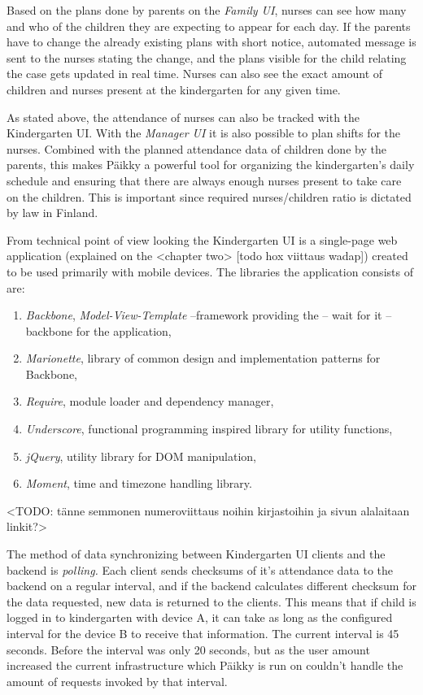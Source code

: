 Based on the plans done by parents on the \textit{Family UI}, nurses can see how many and who of the children they are expecting to appear for each day. If the parents have to change the already existing plans with short notice, automated message is sent to the nurses stating the change, and the plans visible for the child relating the case gets updated in real time. Nurses can also see the exact amount of children and nurses present at the kindergarten for any given time.

As stated above, the attendance of nurses can also be tracked with the Kindergarten UI. With the \textit{Manager UI} it is also possible to plan shifts for the nurses. Combined with the planned attendance data of children done by the parents, this makes Päikky a powerful tool for organizing the kindergarten's daily schedule and ensuring that there are always enough nurses present to take care on the children. This is important since required nurses/children ratio is dictated by law in Finland. %

From technical point of view looking the Kindergarten UI is a single-page web application (explained on the <chapter two> [todo hox viittaus wadap]) created to be used primarily with mobile devices. The libraries the application consists of are: %

\begin{enumerate}
	\item \textit{Backbone}, \textit{Model-View-Template} –framework providing the – wait for it – backbone for the application,
	\item \textit{Marionette}, library of common design and implementation patterns for Backbone,
	\item \textit{Require}, module loader and dependency manager,
	\item \textit{Underscore}, functional programming inspired library for utility functions,
	\item \textit{jQuery}, utility library for DOM manipulation,
	\item \textit{Moment}, time and timezone handling library. 
\end{enumerate}

<TODO: tänne semmonen numeroviittaus noihin kirjastoihin ja sivun alalaitaan linkit?>

The method of data synchronizing between Kindergarten UI clients and the backend is \textit{polling.} Each client sends checksums of it's attendance data to the backend on a regular interval, and if the backend calculates different checksum for the data requested, new data is returned to the clients. This means that if child is logged in to kindergarten with device A, it can take as long as the configured interval for the device B to receive that information. The current interval is 45 seconds. Before the interval was only 20 seconds, but as the user amount increased the current infrastructure which Päikky is run on couldn't handle the amount of requests invoked by that interval. 

